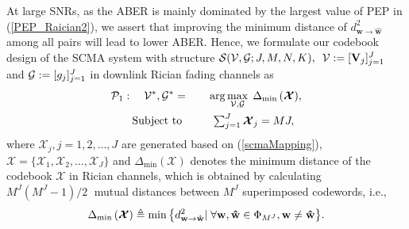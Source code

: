 \documentclass[journal]{IEEEtran}
\begin{document}
  

At large SNRs, as the ABER is mainly dominated  by the largest value of PEP in (\ref{PEP_Raician2}),  we assert that improving  the minimum distance of $d_{ \mathbf{w} \to \mathbf{\hat{w}} }^2$ among all pairs    will lead to lower  ABER. 
Hence, we formulate our codebook design of  the SCMA system  with structure ${\cal S}({\cal V},{\cal G}; J, M, N, K), \, \ {\cal V}: =[{\bf V}_{j}]_{j=1}^{J}$ and ${\cal G}:=[g_{j}]_{j=1}^{J}$ in downlink Rician fading channels as 
 \begin{equation}
 \small
 \label{Opt1}
 \begin{aligned}
  \mathcal {P}_1: \quad   {\cal V}^{\ast},{\cal G}^{\ast}= & \quad \quad \arg\max\limits_{{\cal V},{\cal G}}  \; {{\Delta}_{\min} \left( { \boldsymbol {\mathcal X}} \right)},\\
     \text{Subject to } & \quad \quad  \begin{array}{l}
      \sum\nolimits_{j=1}^{{J}}{ \boldsymbol {\mathcal X}_j} = MJ,
        \end{array}
      \end{aligned}
 \end{equation}
 where $\boldsymbol {\mathcal X}_j, j=1,2,\ldots,J$ are generated based on (\ref{scmaMapping}), $\boldsymbol {\mathcal X} = \{\boldsymbol {\mathcal X}_1,\boldsymbol {\mathcal X}_2,\ldots,\boldsymbol {\mathcal X}_J\}$ and  ${{\Delta}_{\min}\left( { \boldsymbol {\mathcal X}} \right)}$ denotes the minimum distance of the codebook $ { \boldsymbol {\mathcal X}}$ in Rician channels, which  is obtained by calculating  ${{{M}^{J}}\left( {{M}^{J}}-1 \right)}/{2}\;$ mutual distances between ${{M}^{J}}$ superimposed codewords, i.e.,
 \begin{equation} 
 \small
 \label{delta1}
 \begin{aligned}
{{\Delta}_{\min}\left( { \boldsymbol {\mathcal X}} \right)}  \triangleq    \min \big\{ { d_{ \mathbf{w} \to \mathbf{\hat w} }^2  \vert \;    \forall  {{\mathbf{w}}},{{\mathbf{ \hat w}} }\in {\Phi }_{M^J}, 
     {\mathbf{ w}\ne \mathbf{\hat w} }  }   \big\}.
 \end{aligned}
  \end{equation}
\end{document}
